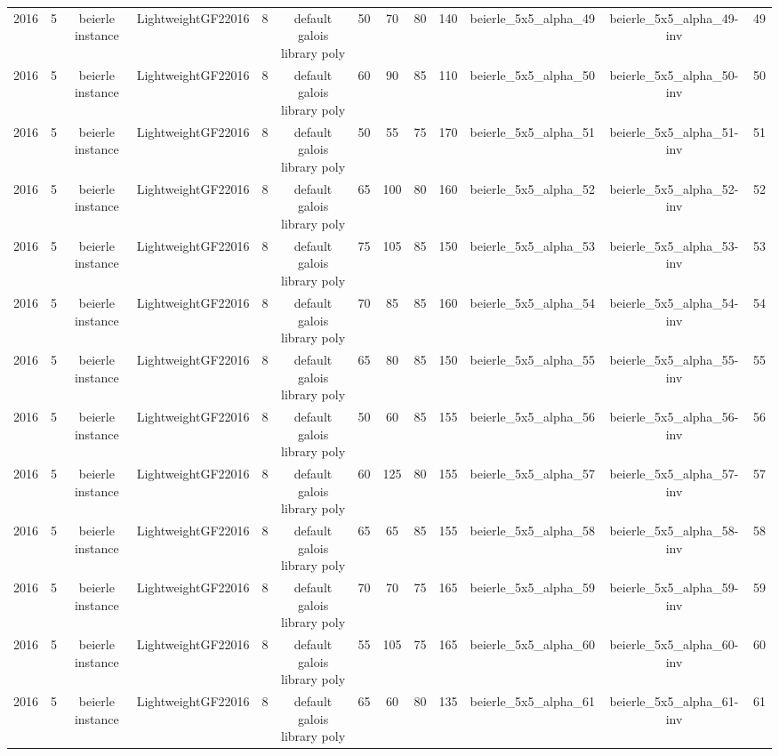 \begin{tabular}{c c c c c c c c c c c c c}
2016 & 5 & beierle instance & LightweightGF22016 & 8 & default galois library poly & 50 & 70 & 80 & 140 & beierle_5x5_alpha_49 & beierle_5x5_alpha_49-inv & 49 \\
2016 & 5 & beierle instance & LightweightGF22016 & 8 & default galois library poly & 60 & 90 & 85 & 110 & beierle_5x5_alpha_50 & beierle_5x5_alpha_50-inv & 50 \\
2016 & 5 & beierle instance & LightweightGF22016 & 8 & default galois library poly & 50 & 55 & 75 & 170 & beierle_5x5_alpha_51 & beierle_5x5_alpha_51-inv & 51 \\
2016 & 5 & beierle instance & LightweightGF22016 & 8 & default galois library poly & 65 & 100 & 80 & 160 & beierle_5x5_alpha_52 & beierle_5x5_alpha_52-inv & 52 \\
2016 & 5 & beierle instance & LightweightGF22016 & 8 & default galois library poly & 75 & 105 & 85 & 150 & beierle_5x5_alpha_53 & beierle_5x5_alpha_53-inv & 53 \\
2016 & 5 & beierle instance & LightweightGF22016 & 8 & default galois library poly & 70 & 85 & 85 & 160 & beierle_5x5_alpha_54 & beierle_5x5_alpha_54-inv & 54 \\
2016 & 5 & beierle instance & LightweightGF22016 & 8 & default galois library poly & 65 & 80 & 85 & 150 & beierle_5x5_alpha_55 & beierle_5x5_alpha_55-inv & 55 \\
2016 & 5 & beierle instance & LightweightGF22016 & 8 & default galois library poly & 50 & 60 & 85 & 155 & beierle_5x5_alpha_56 & beierle_5x5_alpha_56-inv & 56 \\
2016 & 5 & beierle instance & LightweightGF22016 & 8 & default galois library poly & 60 & 125 & 80 & 155 & beierle_5x5_alpha_57 & beierle_5x5_alpha_57-inv & 57 \\
2016 & 5 & beierle instance & LightweightGF22016 & 8 & default galois library poly & 65 & 65 & 85 & 155 & beierle_5x5_alpha_58 & beierle_5x5_alpha_58-inv & 58 \\
2016 & 5 & beierle instance & LightweightGF22016 & 8 & default galois library poly & 70 & 70 & 75 & 165 & beierle_5x5_alpha_59 & beierle_5x5_alpha_59-inv & 59 \\
2016 & 5 & beierle instance & LightweightGF22016 & 8 & default galois library poly & 55 & 105 & 75 & 165 & beierle_5x5_alpha_60 & beierle_5x5_alpha_60-inv & 60 \\
2016 & 5 & beierle instance & LightweightGF22016 & 8 & default galois library poly & 65 & 60 & 80 & 135 & beierle_5x5_alpha_61 & beierle_5x5_alpha_61-inv & 61 \\

\end{tabular}
